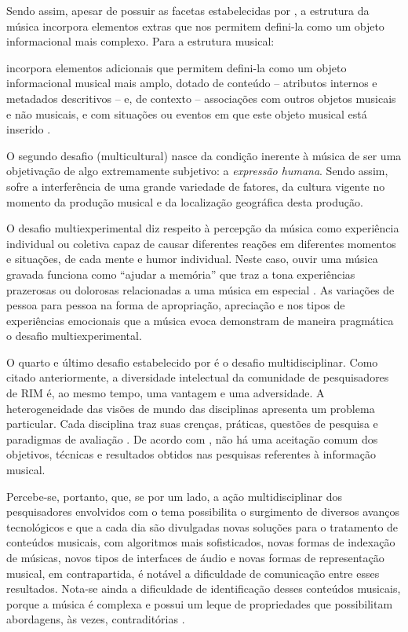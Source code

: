 Sendo assim, apesar de possuir as facetas estabelecidas por \cite{downie2003}, a estrutura da música incorpora elementos extras que nos permitem defini-la como um objeto informacional mais complexo. Para  a estrutura musical:

\begin{citacao}
    [...] incorpora elementos adicionais que permitem defini-la como um objeto informacional musical mais amplo, dotado de conteúdo – atributos internos e metadados descritivos – e, de contexto – associações com outros objetos musicais e não musicais, e com situações ou eventos em que este objeto musical está inserido \cite{cruz2014}.
\end{citacao}

O segundo desafio (multicultural) nasce da condição inerente à música de ser uma objetivação de algo extremamente subjetivo: a \textit{expressão humana}. Sendo assim, sofre a interferência de uma grande variedade de fatores, da cultura vigente no momento da produção musical e da localização geográfica desta produção.

O desafio multiexperimental diz respeito à percepção da música como experiência individual ou coletiva capaz de causar diferentes reações em diferentes momentos e situações, de cada mente e humor individual. Neste caso, ouvir uma música gravada funciona como “ajudar a memória” que traz a tona experiências prazerosas ou dolorosas relacionadas a uma música em especial \cite{downie2003,santini&souza2007}. As variações de pessoa para pessoa na forma de apropriação, apreciação e nos tipos de experiências emocionais que a música evoca demonstram de maneira pragmática o desafio multiexperimental.

O quarto e último desafio estabelecido por  é o desafio multidisciplinar. Como citado anteriormente, a diversidade intelectual da comunidade de pesquisadores de RIM é, ao mesmo tempo, uma vantagem e uma adversidade. A heterogeneidade das visões de mundo das disciplinas apresenta um problema particular. Cada disciplina traz suas crenças, práticas, questões de pesquisa e paradigmas de avaliação \cite{downie2003}. De acordo com , não há uma aceitação comum dos objetivos, técnicas e resultados obtidos nas pesquisas referentes à informação musical.

Percebe-se, portanto, que, se por um lado, a ação multidisciplinar dos pesquisadores envolvidos com o tema possibilita o surgimento de diversos avanços tecnológicos e que a cada dia são divulgadas novas soluções para o tratamento de conteúdos musicais, com algoritmos mais sofisticados, novas formas de indexação de músicas, novos tipos de interfaces de áudio e novas formas de representação musical, em contrapartida, é notável a dificuldade de comunicação entre esses resultados. Nota-se ainda a dificuldade de identificação desses conteúdos musicais, porque a música é complexa e possui um leque de propriedades que possibilitam abordagens, às vezes, contraditórias \cite{cruz2014}.

